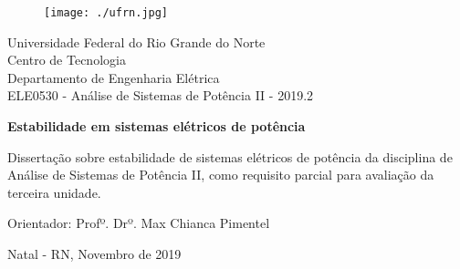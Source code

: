 \begin{titlepage}
	\begin{center}
	
	\begin{figure}[!ht]
	\centering
	\texttt{[image: ./ufrn.jpg]}
	\end{figure}

		Universidade Federal do Rio Grande do Norte \\ Centro de Tecnologia \\ Departamento de Engenharia Elétrica \\ ELE0530 - Análise de Sistemas de Potência II - 2019.2 \\
\vspace{15pt}
        
        \vspace{85pt}
        
		\textbf{\Large{Estabilidade em sistemas elétricos de potência}}\\
			
	\end{center}
\vspace{1,5cm}
	
	\begin{flushright}

   \begin{list}{}{
      \setlength{\leftmargin}{4.5cm}
      \setlength{\rightmargin}{0cm}
      \setlength{\labelwidth}{0pt}
      \setlength{\labelsep}{\leftmargin}}

      \item Dissertação sobre estabilidade de sistemas elétricos de potência da disciplina de Análise de Sistemas de Potência II, como requisito parcial para avaliação da terceira unidade.

      \begin{list}{}{
      \setlength{\leftmargin}{0cm}
      \setlength{\rightmargin}{0cm}
      \setlength{\labelwidth}{0pt}
      \setlength{\labelsep}{\leftmargin}}


            \item Orientador: Profº. Drº. Max Chianca Pimentel

      \end{list}
   \end{list}
\end{flushright}
\vspace{1cm}
\begin{center}
		\vspace{\fill}
		 Natal - RN, Novembro de 2019
			\end{center}
\end{titlepage}
\newpage